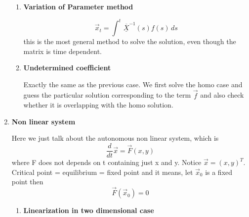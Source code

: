 \documentclass[9pt]{article}
\theoremstyle{definition}
\newcommand{\fundmx}[1]{\overline{\underline{X}}}
\newenvironment{changemargin}[2]{%
  \begin{list}{}{%
    \setlength{\topsep}{0pt}%
    \setlength{\leftmargin}{#1}%
    \setlength{\rightmargin}{#2}%
    \setlength{\listparindent}{\parindent}%
    \setlength{\itemindent}{\parindent}%
    \setlength{\parsep}{\parskip}%
  }%
  \item[]}{\end{list}}
\theoremstyle{theorem}
\theoremstyle{remark}
\theoremstyle{lemma}
\begin{document}
\begin{changemargin}{-0.125in}{0in}
\begin{enumerate}
     \begin{enumerate}
     
     \item \textbf{Variation of Parameter method}
     
     \[
     \overrightarrow{x}_t = \int^t \,\fundmx{a}^{-1}(s)f(s)\,ds
     \]
     this is the most general method to solve the solution, even though the matrix is time dependent. 
     
     \medskip
     
     \item \textbf{Undetermined coefficient}
     
     \smallskip
     
     Exactly the same as the previous case. We first solve the homo case and guess the particular solution corresponding to the term $\overrightarrow{f}$ and also check whether it is overlapping with the homo solution.
     \end{enumerate}
     
     \medskip
     
     \item \textbf{Non linear system}
        
        Here we just talk about the autonomous non linear system, which is 
        \[
        \frac{d}{dt} \overrightarrow{x} = \overrightarrow{F}(x,y) 
        \]
        where F does not depends on t containing just x and y. Notice $\overrightarrow{x} =(x, y)^T $. Critical point = equilibrium = fixed point and it means, let $\overrightarrow{x}_0$ is a fixed point then
        \[
        \overrightarrow{F}(\overrightarrow{x}_0) = 0
        \]
        
        \medskip
        
        \begin{enumerate}
        
        \item \textbf{Linearization in two dimensional case}
        

\end{enumerate}
\end{enumerate}
\end{changemargin}
\end{document}
